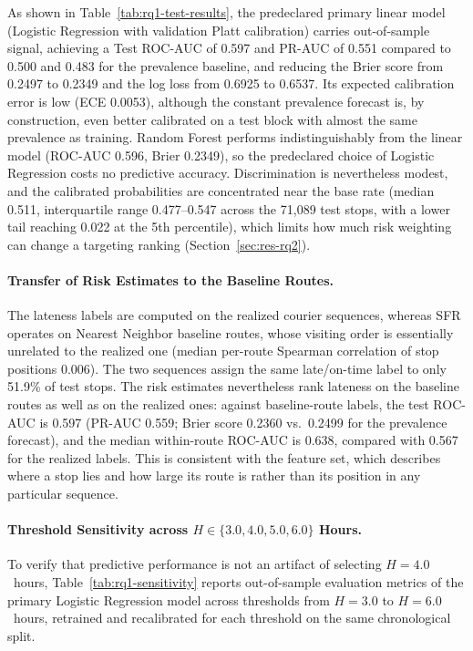 \documentclass[11pt,a4paper]{article}
\begin{document}
As shown in Table~\ref{tab:rq1-test-results}, the predeclared primary linear model (Logistic Regression with validation Platt calibration) carries out-of-sample signal, achieving a Test ROC-AUC of 0.597 and PR-AUC of 0.551 compared to 0.500 and 0.483 for the prevalence baseline, and reducing the Brier score from 0.2497 to 0.2349 and the log loss from 0.6925 to 0.6537. Its expected calibration error is low (ECE 0.0053), although the constant prevalence forecast is, by construction, even better calibrated on a test block with almost the same prevalence as training. Random Forest performs indistinguishably from the linear model (ROC-AUC 0.596, Brier 0.2349), so the predeclared choice of Logistic Regression costs no predictive accuracy. Discrimination is nevertheless modest, and the calibrated probabilities are concentrated near the base rate (median 0.511, interquartile range 0.477--0.547 across the 71,089 test stops, with a lower tail reaching 0.022 at the 5th percentile), which limits how much risk weighting can change a targeting ranking (Section~\ref{sec:res-rq2}).

\paragraph{Transfer of Risk Estimates to the Baseline Routes.}
The lateness labels are computed on the realized courier sequences, whereas SFR operates on Nearest Neighbor baseline routes, whose visiting order is essentially unrelated to the realized one (median per-route Spearman correlation of stop positions 0.006). The two sequences assign the same late/on-time label to only 51.9\% of test stops. The risk estimates nevertheless rank lateness on the baseline routes as well as on the realized ones: against baseline-route labels, the test ROC-AUC is 0.597 (PR-AUC 0.559; Brier score 0.2360 vs.\ 0.2499 for the prevalence forecast), and the median within-route ROC-AUC is 0.638, compared with 0.567 for the realized labels. This is consistent with the feature set, which describes where a stop lies and how large its route is rather than its position in any particular sequence.

\paragraph{Threshold Sensitivity across $H \in \{3.0, 4.0, 5.0, 6.0\}$ Hours.}
To verify that predictive performance is not an artifact of selecting $H = 4.0$~hours, Table~\ref{tab:rq1-sensitivity} reports out-of-sample evaluation metrics of the primary Logistic Regression model across thresholds from $H = 3.0$ to $H = 6.0$~hours, retrained and recalibrated for each threshold on the same chronological split.
\end{document}
